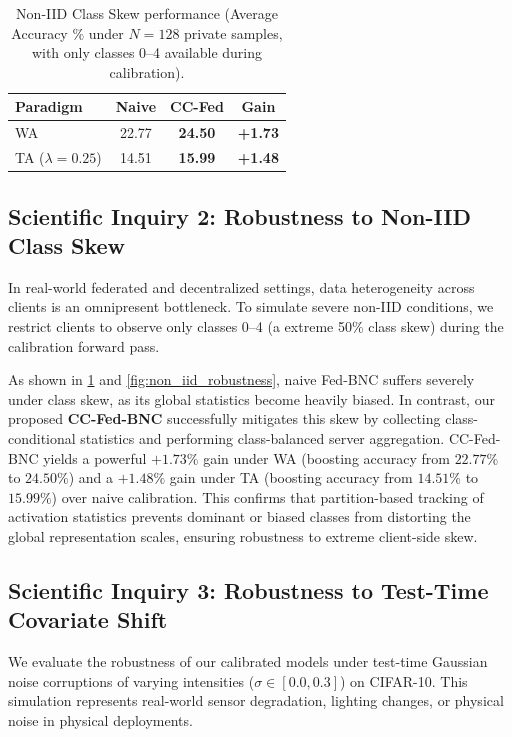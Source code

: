 \documentclass{article}
\theoremstyle{plain}
\theoremstyle{definition}
\theoremstyle{remark}
\begin{document}
\begin{table}[h]
\caption{Non-IID Class Skew performance (Average Accuracy $\%$ under $N=128$ private samples, with only classes 0--4 available during calibration).}
\label{tab:skew_results}
\vskip 0.08in
\begin{center}
\begin{footnotesize}
\begin{sc}
\setlength{\tabcolsep}{6.0pt}
\begin{tabular}{lccc}
\toprule
Paradigm & Naive & CC-Fed & Gain \\
\midrule
WA & 22.77 & \textbf{24.50} & \textbf{+1.73} \\
TA ($\lambda=0.25$) & 14.51 & \textbf{15.99} & \textbf{+1.48} \\
\bottomrule
\end{tabular}
\end{sc}
\end{footnotesize}
\end{center}
\vskip -0.1in
\end{table}

\subsection{Scientific Inquiry 2: Robustness to Non-IID Class Skew}
In real-world federated and decentralized settings, data heterogeneity across clients is an omnipresent bottleneck. To simulate severe non-IID conditions, we restrict clients to observe only classes 0--4 (a extreme 50\% class skew) during the calibration forward pass.

As shown in \cref{tab:skew_results} and \cref{fig:non_iid_robustness}, naive Fed-BNC suffers severely under class skew, as its global statistics become heavily biased. In contrast, our proposed \textbf{CC-Fed-BNC} successfully mitigates this skew by collecting class-conditional statistics and performing class-balanced server aggregation. CC-Fed-BNC yields a powerful \textbf{$+1.73\%$} gain under WA (boosting accuracy from $22.77\%$ to $24.50\%$) and a \textbf{$+1.48\%$} gain under TA (boosting accuracy from $14.51\%$ to $15.99\%$) over naive calibration. This confirms that partition-based tracking of activation statistics prevents dominant or biased classes from distorting the global representation scales, ensuring robustness to extreme client-side skew.

\subsection{Scientific Inquiry 3: Robustness to Test-Time Covariate Shift}
We evaluate the robustness of our calibrated models under test-time Gaussian noise corruptions of varying intensities ($\sigma \in [0.0, 0.3]$) on CIFAR-10. This simulation represents real-world sensor degradation, lighting changes, or physical noise in physical deployments.
\end{document}

